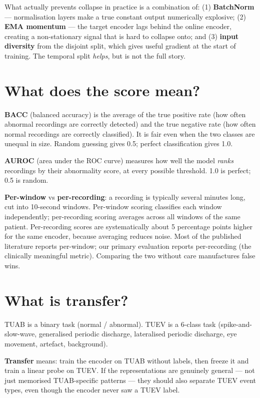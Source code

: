 \documentclass[11pt,a4paper]{article}
\begin{document}
What actually prevents collapse in practice is a combination of:
(1) \textbf{BatchNorm} --- normalisation layers make a true constant output
numerically explosive; (2) \textbf{EMA momentum} --- the target encoder lags
behind the online encoder, creating a non-stationary signal that is hard to
collapse onto; and (3) \textbf{input diversity} from the disjoint split,
which gives useful gradient at the start of training.
The temporal split \emph{helps}, but is not the full story.

\section*{What does the score mean?}

\textbf{BACC} (balanced accuracy) is the average of the true positive rate
(how often abnormal recordings are correctly detected) and the true negative
rate (how often normal recordings are correctly classified).  It is fair even
when the two classes are unequal in size.  Random guessing gives 0.5;
perfect classification gives 1.0.

\textbf{AUROC} (area under the ROC curve) measures how well the model
\emph{ranks} recordings by their abnormality score, at every possible
threshold.  1.0 is perfect; 0.5 is random.

\textbf{Per-window} vs \textbf{per-recording}: a recording is typically
several minutes long, cut into 10-second windows.  Per-window scoring
classifies each window independently; per-recording scoring averages across
all windows of the same patient.  Per-recording scores are systematically
about 5 percentage points higher for the same encoder, because averaging
reduces noise.  Most of the published literature reports per-window;
our primary evaluation reports per-recording (the clinically meaningful metric).
Comparing the two without care manufactures false wins.

\section*{What is transfer?}

TUAB is a binary task (normal / abnormal).
TUEV is a 6-class task (spike-and-slow-wave, generalised periodic discharge,
lateralised periodic discharge, eye movement, artefact, background).

\textbf{Transfer} means: train the encoder on TUAB without labels, then freeze
it and train a linear probe on TUEV.  If the representations are genuinely
general — not just memorised TUAB-specific patterns — they should also separate
TUEV event types, even though the encoder never saw a TUEV label.
\end{document}
